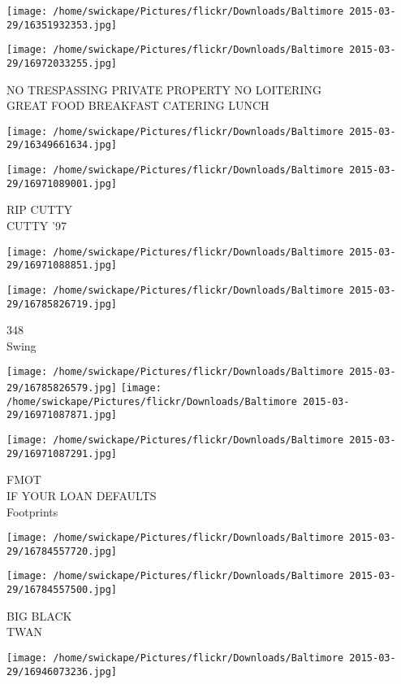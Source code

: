 \documentclass[10pt,letterpaper]{article}
\begin{document}
\texttt{[image: /home/swickape/Pictures/flickr/Downloads/Baltimore 2015-03-29/16351932353.jpg]}

\vspace{0.25in}
\texttt{[image: /home/swickape/Pictures/flickr/Downloads/Baltimore 2015-03-29/16972033255.jpg]}

NO TRESPASSING PRIVATE PROPERTY NO LOITERING\\
GREAT FOOD BREAKFAST CATERING LUNCH
\pagebreak

\texttt{[image: /home/swickape/Pictures/flickr/Downloads/Baltimore 2015-03-29/16349661634.jpg]}

\vspace{0.25in}
\texttt{[image: /home/swickape/Pictures/flickr/Downloads/Baltimore 2015-03-29/16971089001.jpg]}

RIP CUTTY\\
CUTTY '97
\pagebreak

\texttt{[image: /home/swickape/Pictures/flickr/Downloads/Baltimore 2015-03-29/16971088851.jpg]}

\vspace{0.25in}
\texttt{[image: /home/swickape/Pictures/flickr/Downloads/Baltimore 2015-03-29/16785826719.jpg]}

348\\
Swing
\pagebreak

\texttt{[image: /home/swickape/Pictures/flickr/Downloads/Baltimore 2015-03-29/16785826579.jpg]}
\texttt{[image: /home/swickape/Pictures/flickr/Downloads/Baltimore 2015-03-29/16971087871.jpg]}

\texttt{[image: /home/swickape/Pictures/flickr/Downloads/Baltimore 2015-03-29/16971087291.jpg]}

FMOT\\
IF YOUR LOAN DEFAULTS\\
Footprints
\pagebreak

\texttt{[image: /home/swickape/Pictures/flickr/Downloads/Baltimore 2015-03-29/16784557720.jpg]}

\vspace{0.25in}
\texttt{[image: /home/swickape/Pictures/flickr/Downloads/Baltimore 2015-03-29/16784557500.jpg]}

BIG BLACK\\
TWAN
\pagebreak

\texttt{[image: /home/swickape/Pictures/flickr/Downloads/Baltimore 2015-03-29/16946073236.jpg]}
\end{document}
